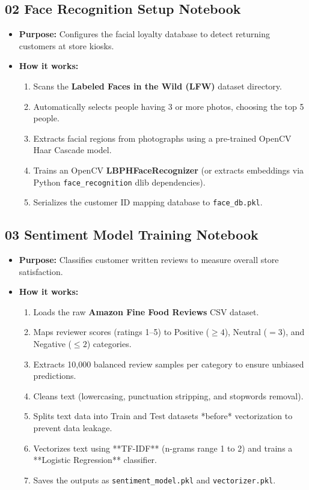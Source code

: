 \documentclass[12pt,a4paper]{article}
\begin{document}
\subsection{02 Face Recognition Setup Notebook}
\begin{itemize}
    \item \textbf{Purpose:} Configures the facial loyalty database to detect returning customers at store kiosks.
    \item \textbf{How it works:}
        \begin{enumerate}
            \item Scans the \textbf{Labeled Faces in the Wild (LFW)} dataset directory.
            \item Automatically selects people having 3 or more photos, choosing the top 5 people.
            \item Extracts facial regions from photographs using a pre-trained OpenCV Haar Cascade model.
            \item Trains an OpenCV \textbf{LBPHFaceRecognizer} (or extracts embeddings via Python \texttt{face\_recognition} dlib dependencies).
            \item Serializes the customer ID mapping database to \texttt{face\_db.pkl}.
        \end{enumerate}
\end{itemize}

\subsection{03 Sentiment Model Training Notebook}
\begin{itemize}
    \item \textbf{Purpose:} Classifies customer written reviews to measure overall store satisfaction.
    \item \textbf{How it works:}
        \begin{enumerate}
            \item Loads the raw \textbf{Amazon Fine Food Reviews} CSV dataset.
            \item Maps reviewer scores (ratings 1--5) to Positive ($\ge 4$), Neutral ($= 3$), and Negative ($\le 2$) categories.
            \item Extracts 10,000 balanced review samples per category to ensure unbiased predictions.
            \item Cleans text (lowercasing, punctuation stripping, and stopwords removal).
            \item Splits text data into Train and Test datasets *before* vectorization to prevent data leakage.
            \item Vectorizes text using **TF-IDF** (n-grams range 1 to 2) and trains a **Logistic Regression** classifier.
            \item Saves the outputs as \texttt{sentiment\_model.pkl} and \texttt{vectorizer.pkl}.
        \end{enumerate}
\end{itemize}
\end{document}
